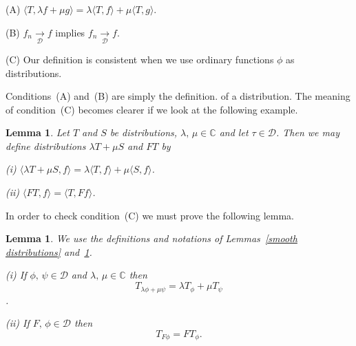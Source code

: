 \documentclass[12pt]{article}
\newtheorem{lemma}[theorem]{Lemma}
\theoremstyle{definition}
\newcommand{\arrowD}{\underset{\mathcal D}{\rightarrow}}
\begin{document}
(A) $\langle T,\lambda f+\mu g\rangle=
\lambda \langle T,f\rangle
+\mu \langle T,g\rangle$.

(B) $f_{n}\arrowD f$ implies $f_{n}\arrowD f$.

(C) Our definition is consistent when we use ordinary
functions $\phi$ as distributions.

\noindent Conditions~(A) and~(B) are simply the definition.
of a distribution. The meaning of condition~(C) becomes
clearer if we look at the following example.
\begin{lemma}\label{sum distributions}
Let $T$ and $S$ be distributions,
$\lambda,\,\mu\in{\mathbb C}$ and
let $\tau\in{\mathcal D}$. Then we may define distributions
$\lambda T+\mu S$ and $FT$ by

(i) $\langle\lambda T+\mu S,f\rangle=\lambda\langle T,f\rangle
+\mu \langle S,f\rangle$.

(ii) $\langle FT,f\rangle=\langle T,Ff\rangle$.
\end{lemma}
In order to check condition~(C) we must prove the following lemma.
\begin{lemma} We use the definitions and notations of
Lemmas~\ref{smooth distributions} and~\ref{sum distributions}.

(i) If $\phi,\,\psi\in{\mathcal D}$ and
$\lambda,\,\mu\in{\mathbb C}$ then
\[T_{\lambda\phi+\mu\psi}=\lambda T_{\phi}+\mu T_{\psi}\].

(ii) If $F,\, \phi\in{\mathcal D}$ then
\[T_{F\phi}=FT_{\phi}.\]
\end{lemma}
\end{document}
